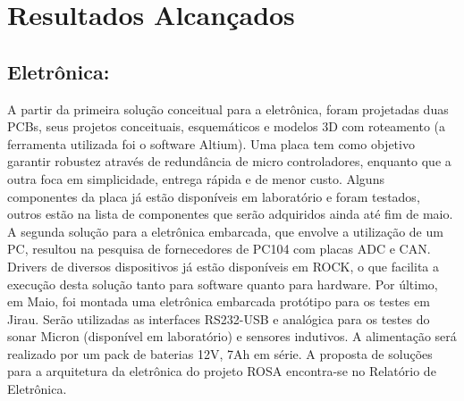 
\setcounter{secnumdepth}{3}
\section{Resultados Alcançados}
\label{resultados_alcancados}

\subsection{Eletrônica:}

A partir da primeira solução conceitual para a eletrônica, foram projetadas duas PCBs, seus projetos conceituais, esquemáticos e modelos 3D com roteamento (a ferramenta utilizada foi o software Altium). Uma placa tem como objetivo garantir robustez através de redundância de micro controladores, enquanto que a outra foca em simplicidade, entrega rápida e de menor custo. Alguns componentes da placa já estão disponíveis em laboratório e foram testados, outros estão na lista de componentes que serão adquiridos ainda até fim de maio.
A segunda solução para a eletrônica embarcada, que envolve a utilização de um PC, resultou na pesquisa de fornecedores de PC104 com placas ADC e CAN. Drivers de diversos dispositivos já estão disponíveis em ROCK, o que facilita a execução desta solução tanto para software quanto para hardware.  
Por último, em Maio, foi montada uma eletrônica embarcada protótipo para os testes em Jirau. Serão utilizadas as interfaces RS232-USB e analógica para os testes do sonar Micron (disponível em laboratório) e sensores indutivos. A alimentação será realizado por um pack de baterias 12V, 7Ah em série. A proposta de soluções para a arquitetura da eletrônica do projeto ROSA encontra-se no Relatório de Eletrônica. 

